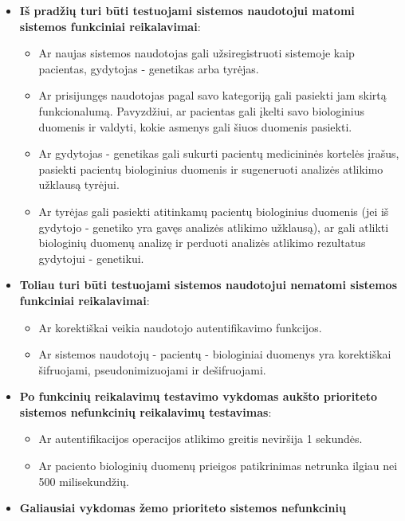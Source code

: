 \documentclass[12pt]{article}
\begin{document}
\begin{itemize}
    \item \textbf{Iš pradžių turi būti testuojami sistemos naudotojui matomi
    sistemos funkciniai reikalavimai}:
    \begin{itemize}[label=$\circ$]
        \item Ar naujas sistemos naudotojas gali užsiregistruoti sistemoje kaip
        pacientas, gydytojas - genetikas arba tyrėjas.
        \item Ar prisijungęs naudotojas pagal savo kategoriją gali pasiekti jam
        skirtą funkcionalumą. Pavyzdžiui, ar pacientas gali įkelti savo
        biologinius duomenis ir valdyti, kokie asmenys gali šiuos duomenis
        pasiekti.
        \item Ar gydytojas - genetikas gali sukurti pacientų medicininės
        kortelės įrašus, pasiekti pacientų biologinius duomenis ir sugeneruoti
        analizės atlikimo užklausą tyrėjui.
        \item Ar tyrėjas gali pasiekti atitinkamų pacientų biologinius duomenis
        (jei iš gydytojo -  genetiko yra gavęs analizės atlikimo užklausą), ar
        gali atlikti biologinių duomenų analizę ir perduoti analizės atlikimo
        rezultatus gydytojui - genetikui.
    \end{itemize}
    \item \textbf{Toliau turi būti testuojami sistemos naudotojui nematomi
    sistemos funkciniai reikalavimai}:
    \begin{itemize}[label=$\circ$]
        \item Ar korektiškai veikia naudotojo autentifikavimo funkcijos.
        \item Ar sistemos naudotojų - pacientų - biologiniai duomenys yra
        korektiškai šifruojami, pseudonimizuojami ir dešifruojami.
    \end{itemize}
    \item \textbf{Po funkcinių reikalavimų testavimo vykdomas aukšto prioriteto
    sistemos ne\-funk\-ci\-nių reikalavimų testavimas}:
    \begin{itemize}[label=$\circ$]
        \item Ar autentifikacijos operacijos atlikimo greitis neviršija 1
        sekundės.
        \item Ar paciento biologinių duomenų prieigos patikrinimas netrunka
        ilgiau nei 500 milisekundžių.
    \end{itemize}
    \item \textbf{Galiausiai vykdomas žemo prioriteto sistemos nefunkcinių
}
\end{itemize}
\end{document}
